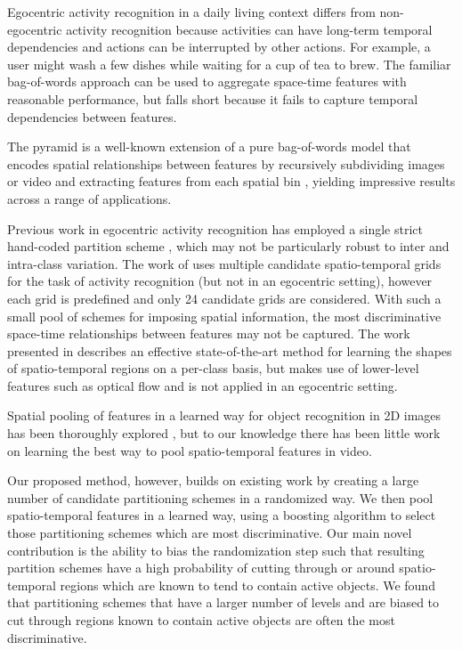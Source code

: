 \documentclass[10pt,twocolumn,letterpaper]{article}
\begin{document}
  Egocentric activity recognition in a daily living context differs from
  non-egocentric activity recognition because activities can have long-term
  temporal dependencies and actions can be interrupted by other actions. For
  example, a user might wash a few dishes while waiting for a cup of tea
  to brew. The familiar bag-of-words approach can be used to aggregate space-time
  features with reasonable performance,  but falls short because it
  fails to capture temporal dependencies between features.

  The pyramid is a well-known extension of a pure bag-of-words model that encodes spatial
  relationships between features by recursively subdividing images or video and extracting 
  features from each spatial bin \cite{Lazebnik06}, yielding impressive
  results across a range of applications.

  Previous work in egocentric activity recognition has employed a single strict
  hand-coded partition scheme \cite{Ramanan12}, which may not be particularly robust to
  inter and intra-class variation. The work of \cite{Laptev08} uses multiple
  candidate spatio-temporal grids for the task of activity recognition (but
  not in an egocentric setting), however each grid is predefined and only 24
  candidate grids are considered. With such a small pool of schemes for imposing spatial
  information, the most discriminative space-time relationships between features may not be 
  captured. The work presented in \cite{Kovashka10}
  describes an effective state-of-the-art method for learning the shapes of spatio-temporal
  regions on a per-class basis, but makes use of lower-level features such as optical flow and
  is not applied in an egocentric setting.

  Spatial pooling of features in a learned way for object recognition in 2D images
  has been thoroughly
  explored \cite{Sharma11}, but to our knowledge there has been little work
  on learning the best way to pool spatio-temporal features in video.
  
  Our proposed method, however, builds on existing work by creating a large number
  of candidate partitioning schemes in a randomized way. 
  We then pool spatio-temporal features in a
  learned way, using a boosting algorithm to select those partitioning schemes which are most discriminative.
  Our main novel contribution is
  the ability to bias the randomization step such that 
  resulting partition schemes have a high probability of cutting through or around
  spatio-temporal regions which are known to tend to contain active objects.
  We found that partitioning schemes that have a larger number of levels and
  are biased to cut through regions known to contain active
  objects are often the most discriminative.
\end{document}
